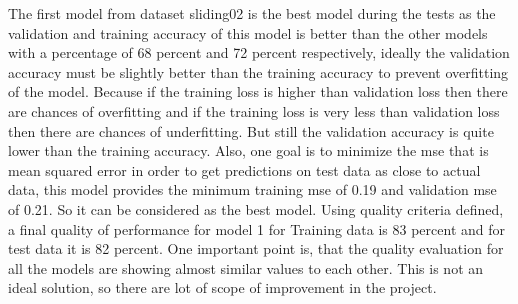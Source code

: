 \begin{table}
\centering
{}
\caption{ Quality Model for models with different hidden units for dataset sliding03}
\label{table:qualitymodelregression2}
\end{table}

The first model from dataset sliding02 is the best model during the tests as the  validation and training accuracy of this model is better than the other models with a percentage of 68 percent and 72 percent respectively, ideally the validation accuracy must be slightly better than the training accuracy to prevent overfitting of the model. Because if the training loss is higher than validation loss then there are chances of overfitting and if the training loss is very less than validation loss then there are chances of underfitting. But still the validation accuracy is quite lower than the training accuracy.\newline
Also, one goal is to minimize the mse that is mean squared error in order to get predictions on test data as close to actual data, this model provides the minimum training mse of 0.19 and validation mse of 0.21. So it can be considered as the best model.\newline
Using quality criteria defined, a final quality of performance for model 1 for Training data is 83 percent and for test data it is 82 percent. One important point is, that the quality evaluation for all the models are showing almost similar values to each other. This is not an ideal solution, so there are lot of scope of improvement in the project.\newline

